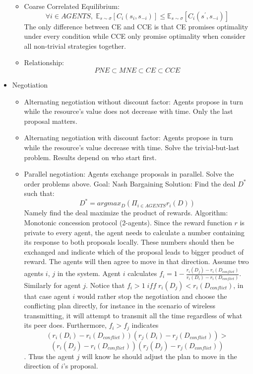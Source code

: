 \documentclass{article}
\begin{document}
\begin{itemize}
\begin{itemize}
        \item Coarse Correlated Equilibrium:
        $$\forall i \in AGENTS,\; \mathbb{E}_{s \sim \sigma}[C_{i}(s_{i}, s_{-i})] \leq \mathbb{E}_{s \sim \sigma}[C_{i}(s^{'}, s_{-i})]$$
        The only difference between CE and CCE is that CE promises optimality under every condition while CCE only promise optimality when consider all non-trivial strategies together.
        
        \item Relationship:
        $$PNE \subset MNE \subset CE \subset CCE$$
    \end{itemize}
    
    \item Negotiation
    \begin{itemize}
        \item Alternating negotiation without discount factor: Agents propose in turn while the resource's value does not decrease with time. Only the last proposal matters.
        \item Alternating negotiation with discount factor: Agents propose in turn while the resource's value decrease with time. Solve the trivial-but-last problem. Results depend on who start first.
        \item Parallel negotiation: Agents exchange proposals in parallel. Solve the order problems above. \newline
        Goal: Nash Bargaining Solution: Find the deal $D^{*}$ such that:
        $$D^{*}=argmax_{D}(\Pi_{i \in AGENTS}r_{i}(D))$$
        Namely find the deal maximize the product of rewards. \newline
        Algorithm: Monotonic concession protocol (2-agents). \newline
        Since the reward function $r$ is private to every agent, the agent needs to calculate a number containing its response to both proposals locally. These numbers should then be exchanged and indicate which of the proposal leads to bigger product of reward. The agents will then agree to move in that direction. \newline
        Assume two agents $i$, $j$ in the system. Agent $i$ calculates $f_{i}=1 - \frac{r_{i}(D_{j}) - r_{i}(D_{conflict})}{r_{i}(D_{i}) - r_{i}(D_{conflict})}$. Similarly for agent $j$. \newline
        Notice that $f_{i} > 1\; iff\; r_{i}(D_{j}) < r_{i}(D_{conflict})$, in that case agent $i$ would rather stop the negotiation and choose the conflicting plan directly, for instance in the scenario of wireless transmitting, it will attempt to transmit all the time regardless of what its peer does. \newline
        Furthermore, $f_{i} > f_{j}$ indicates
        $$(r_{i}(D_{i}) - r_{i}(D_{conflict}))(r_{j}(D_{i}) - r_{j}(D_{conflict})) >$$ $$ (r_{i}(D_j) - r_{i}(D_{conflict}))(r_{j}(D_{j}) - r_{j}(D_{conflict}))$$.
        Thus the agent $j$ will know he should adjust the plan to move in the direction of $i$'s proposal.
        
        
    \end{itemize}
\end{itemize}
\end{document}
